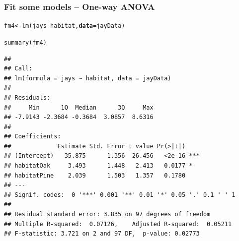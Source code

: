 \documentclass[color=usenames,dvipsnames]{beamer}\usepackage[]{graphicx}\usepackage[]{color}
\makeatletter
\newcommand{\hlopt}[1]{\textcolor[rgb]{0,0,0}{#1}}%
\newcommand{\hlstd}[1]{\textcolor[rgb]{0,0,0}{#1}}%
\newcommand{\hlkwb}[1]{\textcolor[rgb]{0,0.341,0.682}{#1}}%
\newcommand{\hlkwc}[1]{\textcolor[rgb]{0,0,0}{\textbf{#1}}}%
\newcommand{\hlkwd}[1]{\textcolor[rgb]{0.004,0.004,0.506}{#1}}%
\newenvironment{kframe}{%
 \def\at@end@of@kframe{}%
 \ifinner\ifhmode%
  \def\at@end@of@kframe{\end{minipage}}%
  \begin{minipage}{\columnwidth}%
 \fi\fi%
 \def\FrameCommand##1{\hskip\@totalleftmargin \hskip-\fboxsep
 \colorbox{shadecolor}{##1}\hskip-\fboxsep
     \hskip-\linewidth \hskip-\@totalleftmargin \hskip\columnwidth}%
 \MakeFramed {\advance\hsize-\width
   \@totalleftmargin\z@ \linewidth\hsize
   \@setminipage}}%
 {\par\unskip\endMakeFramed%
 \at@end@of@kframe}
\newenvironment{knitrout}{}{} %
\makeatother
\begin{document}
\begin{frame}[fragile]
  \frametitle{Fit some models -- One-way ANOVA}
  \scriptsize
\begin{knitrout}\scriptsize
{}\color{fgcolor}\begin{kframe}
\begin{alltt}
\hlstd{fm4} \hlkwb{<-} \hlkwd{lm}\hlstd{(jays} \hlopt{~} \hlstd{habitat,} \hlkwc{data}\hlstd{=jayData)}
\end{alltt}
\end{kframe}
\end{knitrout}
\pause
\begin{knitrout}\scriptsize
{}\color{fgcolor}\begin{kframe}
\begin{alltt}
\hlkwd{summary}\hlstd{(fm4)}
\end{alltt}
\begin{verbatim}
## 
## Call:
## lm(formula = jays ~ habitat, data = jayData)
## 
## Residuals:
##     Min      1Q  Median      3Q     Max 
## -7.9143 -2.3684 -0.3684  3.0857  8.6316 
## 
## Coefficients:
##             Estimate Std. Error t value Pr(>|t|)    
## (Intercept)   35.875      1.356  26.456   <2e-16 ***
## habitatOak     3.493      1.448   2.413   0.0177 *  
## habitatPine    2.039      1.503   1.357   0.1780    
## ---
## Signif. codes:  0 '***' 0.001 '**' 0.01 '*' 0.05 '.' 0.1 ' ' 1
## 
## Residual standard error: 3.835 on 97 degrees of freedom
## Multiple R-squared:  0.07126,	Adjusted R-squared:  0.05211 
## F-statistic: 3.721 on 2 and 97 DF,  p-value: 0.02773
\end{verbatim}
\end{kframe}
\end{knitrout}
\end{frame}
\end{document}
